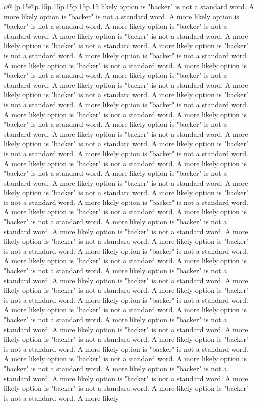 \documentclass{article}
\begin{document}
{\begin{supertabular}{c@{$\;$}|p{.15\linewidth}@{}p{.15\linewidth}p{.15\linewidth}p{.15\linewidth}p{.15\linewidth}p{.15\linewidth}}
{{{likely option is "backer" is not a standard word. A more likely option is "backer" is not a standard word. A more likely option is "backer" is not a standard word. A more likely option is "backer" is not a standard word. A more likely option is "backer" is not a standard word. A more likely option is "backer" is not a standard word. A more likely option is "backer" is not a standard word. A more likely option is "backer" is not a standard word. A more likely option is "backer" is not a standard word. A more likely option is "backer" is not a standard word. A more likely option is "backer" is not a standard word. A more likely option is "backer" is not a standard word. A more likely option is "backer" is not a standard word. A more likely option is "backer" is not a standard word. A more likely option is "backer" is not a standard word. A more likely option is "backer" is not a standard word. A more likely option is "backer" is not a standard word. A more likely option is "backer" is not a standard word. A more likely option is "backer" is not a standard word. A more likely option is "backer" is not a standard word. A more likely option is "backer" is not a standard word. A more likely option is "backer" is not a standard word. A more likely option is "backer" is not a standard word. A more likely option is "backer" is not a standard word. A more likely option is "backer" is not a standard word. A more likely option is "backer" is not a standard word. A more likely option is "backer" is not a standard word. A more likely option is "backer" is not a standard word. A more likely option is "backer" is not a standard word. A more likely option is "backer" is not a standard word. A more likely option is "backer" is not a standard word. A more likely option is "backer" is not a standard word. A more likely option is "backer" is not a standard word. A more likely option is "backer" is not a standard word. A more likely option is "backer" is not a standard word. A more likely option is "backer" is not a standard word. A more likely option is "backer" is not a standard word. A more likely option is "backer" is not a standard word. A more likely option is "backer" is not a standard word. A more likely option is "backer" is not a standard word. A more likely option is "backer" is not a standard word. A more likely option is "backer" is not a standard word. A more likely option is "backer" is not a standard word. A more likely option is "backer" is not a standard word. A more likely option is "backer" is not a standard word. A more likely option is "backer" is not a standard word. A more likely option is "backer" is not a standard word. A more likely option is "backer" is not a standard word. A more likely option is "backer" is not a standard word. A more likely option is "backer" is not a standard word. A more likely option is "backer" is not a standard word. A more likely option is "backer" is not a standard word. A more likely option is "backer" is not a standard word. A more likely option is "backer" is not a standard word. A more likely option is "backer" is not a standard word. A more likely option is "backer" is not a standard word. A more likely }}}
\end{supertabular}}
\end{document}
